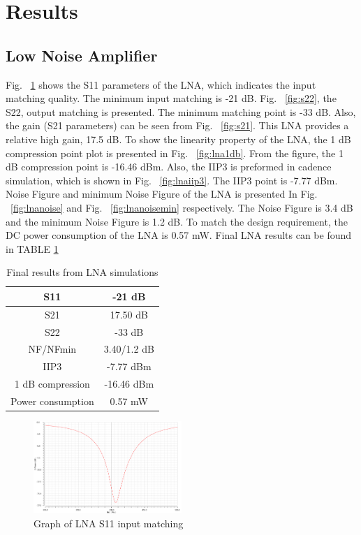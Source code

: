 \section{Results}
\subsection{Low Noise Amplifier}
Fig. ~\ref{fig:s11} shows the S11 parameters of the LNA, which indicates the input matching quality. The minimum input matching is -21 dB. Fig. ~\ref{fig:s22}, the S22, output matching is presented. The minimum matching point is -33 dB. Also, the gain (S21 parameters) can be seen from Fig. ~\ref{fig:s21}. This LNA provides a relative high gain, 17.5 dB. To show the linearity property of the LNA, the 1 dB compression point plot is presented in Fig. ~\ref{fig:lna1db}. From the figure, the 1 dB compression point is -16.46 dBm. Also, the IIP3 is preformed in cadence simulation, which is shown in Fig. ~\ref{fig:lnaiip3}. The IIP3 point is -7.77 dBm. Noise Figure and minimum Noise Figure of the LNA is presented In Fig. ~\ref{fig:lnanoise} and Fig. ~\ref{fig:lnanoisemin} respectively. The Noise Figure is 3.4 dB and the minimum Noise Figure is 1.2 dB. To match the design requirement, the DC power consumption of the LNA is 0.57 mW. Final LNA results can be found in TABLE \ref{tab:lnaresults}

\begin{table}[H]
\begin{center}
	\begin{tabular}{ |c | c | }
 		\hline                      
  		S11 & -21 dB \\ \hline
  		S21 &  17.50 dB \\ \hline
  		S22 & -33 dB \\ \hline
		NF/NFmin & 3.40/1.2 dB \\ \hline
		IIP3 & -7.77 dBm\\ \hline
		1 dB compression & -16.46 dBm \\  \hline
		Power consumption & 0.57 mW \\ 
  		\hline  
	\end{tabular}

\end{center}
\caption{Final results from LNA simulations}
\label{tab:lnaresults}
\end{table}

\begin{figure}[H]
   \centering
    \includegraphics[width=0.5\textwidth]{figures/s11.png}
    \caption{Graph of LNA S11 input matching}
    \label{fig:s11}
\end{figure}

